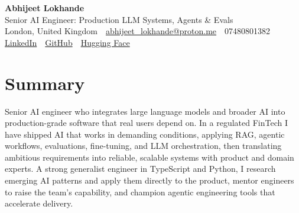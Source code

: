\documentclass[10pt,a4paper]{article}
\newcommand{\sep}{\,\textcolor{accent!60}{\textbar}\,}
\begin{document}
\begin{center}
  {\fontsize{24}{26}\selectfont\bfseries Abhijeet Lokhande}\\[3pt]
  {\color{accent}\large Senior AI Engineer: Production LLM Systems, Agents \& Evals}\\[5pt]
  {\small
    London, United Kingdom \sep
    \href{mailto:abhijeet_lokhande@proton.me}{abhijeet\_lokhande@proton.me} \sep
    07480801382 \\[2pt]
    \href{https://www.linkedin.com/in/ablds/}{LinkedIn} \sep
    \href{https://github.com/abhijeetscode}{GitHub} \sep
    \href{https://huggingface.co/ab-ai}{Hugging Face}
  }
\end{center}
\vspace{2pt}

\section{Summary}
Senior AI engineer who integrates large language models and broader AI into production-grade software that real users depend on. In a regulated FinTech I have shipped AI that works in demanding conditions, applying RAG, agentic workflows, evaluations, fine-tuning, and LLM orchestration, then translating ambitious requirements into reliable, scalable systems with product and domain experts. A strong generalist engineer in TypeScript and Python, I research emerging AI patterns and apply them directly to the product, mentor engineers to raise the team's capability, and champion agentic engineering tools that accelerate delivery.

\end{document}

